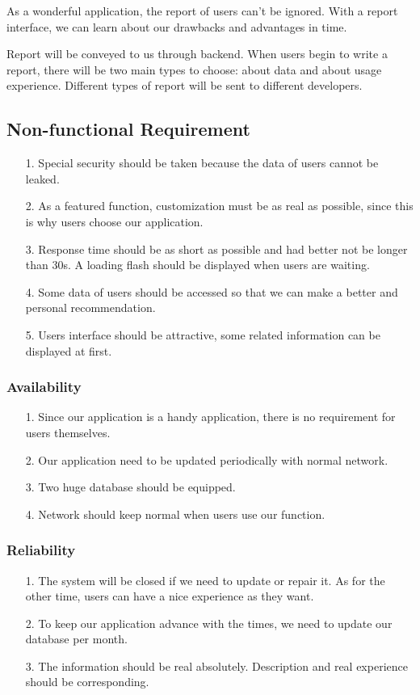 \documentclass[10pt]{article}
\begin{document}
As a wonderful application, the report of users can’t be ignored. With a report interface, we can learn about our drawbacks and advantages in time.

Report will be conveyed to us through backend. When users begin to write a report, there will be two main types to choose: about data and about usage experience. Different types of report will be sent to different developers. 

\subsection{Non-functional Requirement}
\begin{itemize}
	\item[1.]Special security should be taken because the data of users cannot be leaked.
	\item[2.] As a featured function, customization must be as real as possible, since this is why users choose our application.
	\item[3.]  Response time should be as short as possible and had better not be longer than 30s. A loading flash should be displayed when users are waiting.
	\item[4.] Some data of users should be accessed so that we can make a better and personal recommendation.
	\item[5.]Users interface should be attractive, some related information can be displayed at first.
\end{itemize}

\subsubsection{Availability}
\begin{itemize}
	\item[1.] Since our application is a handy application, there is no requirement for users themselves.
	\item[2.] Our application need to be updated periodically with normal network.
	\item[3.] Two huge database should be equipped.
	\item[4.] Network should keep normal when users use our function.
\end{itemize}

\subsubsection{Reliability}
\begin{itemize}
	\item[1.] The system will be closed if we need to update or repair it. As for the other time, users can have a nice experience as they want. 
	\item[2.]To keep our application advance with the times, we need to update our database per month. 
	\item[3.] The information should be real absolutely. Description and real experience should be corresponding. 
\end{itemize}
\end{document}
